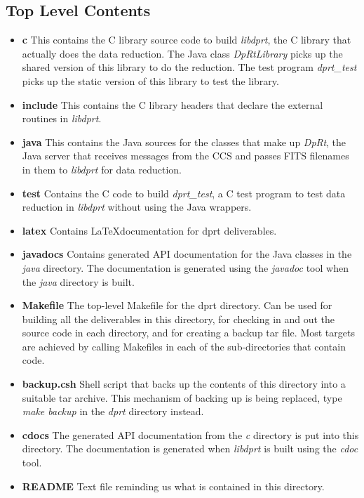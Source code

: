 \documentclass[10pt,a4paper]{article}
\begin{document}
\subsection{Top Level Contents}
\begin{itemize}
\item {\bf c} This contains the C library source code to build {\em libdprt}, the C library that actually does the
data reduction. The Java class {\em DpRtLibrary} picks up the shared version of this library to do the reduction.
The test program {\em dprt\_test} picks up the static version of this library to test the library.
\item {\bf include} This contains the C library headers that declare the external routines in {\em libdprt}.
\item {\bf java} This contains the Java sources for the classes that make up {\em DpRt}, the Java server that 
receives messages from the CCS and passes FITS filenames in them to {\em libdprt} for data reduction.
\item {\bf test} Contains the C code to build {\em dprt\_test}, a C test program to test data reduction in 
{\em libdprt} without using the Java wrappers.
\item {\bf latex} Contains \LaTeX documentation for dprt deliverables.
\item {\bf javadocs} Contains generated API documentation for the Java classes in the {\em java} directory. The 
documentation is generated using the {\em javadoc} tool when the {\em java} directory is built.
\item {\bf Makefile} The top-level Makefile for the dprt directory. Can be used for building all the
deliverables in this directory, for checking in  and out the source code in each directory, and for creating a 
backup tar file. Most targets are achieved by calling Makefiles in each of the sub-directories that contain code.
\item {\bf backup.csh} Shell script that backs up the contents of this directory into a suitable tar archive.
This mechanism of backing up is being replaced, type {\em make backup} in the {\em dprt} directory instead.
\footnotemark
\item {\bf cdocs} The generated API documentation from the {\em c} directory is put into this directory. The
documentation is generated when {\em libdprt} is built using the {\em cdoc} tool.
\item {\bf README} Text file reminding us what is contained in this directory.
\end{itemize}
\end{document}
